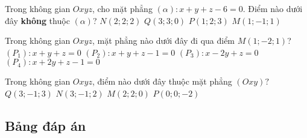 \begin{ex}%
	Trong không gian  $Oxyz$, cho mặt phẳng $(\alpha):x+y+z-6=0$. Điểm nào dưới đây \textbf{không} thuộc $(\alpha)$?
	\choice
	{$N(2;2;2)$}
	{$Q(3;3;0)$}
	{$P(1;2;3)$}
	{\True $M(1;-1;1)$}
\end{ex}

\begin{ex}%
	Trong không gian $Oxyz$, mặt phẳng nào dưới đây đi qua điểm $M(1;-2;1)$?
	\choice
	{\True $\left(P_1\right)\colon x+y+z=0$}	
	{$\left(P_2\right)\colon x+y+z-1=0$}
	{$\left(P_3\right)\colon x-2y+z=0$}
	{$\left(P_4\right)\colon x+2y+z-1=0$}
\end{ex}

\begin{ex}%
	Trong không gian $Oxyz$, điểm nào dưới đây thuộc mặt phẳng $(Oxy)?$
	\choice
	{$Q(3;-1;3)$}
	{$N(3;-1;2)$}
	{\True $M(2;2;0)$}
	{$P(0;0;-2)$}
\end{ex}
\subsection{Bảng đáp án}
